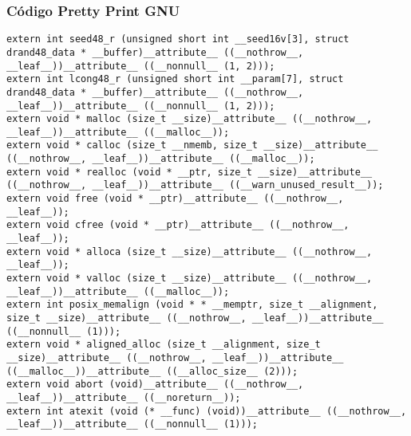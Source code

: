 \documentclass{beamer}
\begin{document}
\begin{frame}[fragile]
\frametitle{C\'odigo Pretty Print GNU}
\begin{verbatim}
extern int seed48_r (unsigned short int __seed16v[3], struct drand48_data * __buffer)__attribute__ ((__nothrow__, __leaf__))__attribute__ ((__nonnull__ (1, 2)));
extern int lcong48_r (unsigned short int __param[7], struct drand48_data * __buffer)__attribute__ ((__nothrow__, __leaf__))__attribute__ ((__nonnull__ (1, 2)));
extern void * malloc (size_t __size)__attribute__ ((__nothrow__, __leaf__))__attribute__ ((__malloc__));
extern void * calloc (size_t __nmemb, size_t __size)__attribute__ ((__nothrow__, __leaf__))__attribute__ ((__malloc__));
extern void * realloc (void * __ptr, size_t __size)__attribute__ ((__nothrow__, __leaf__))__attribute__ ((__warn_unused_result__));
extern void free (void * __ptr)__attribute__ ((__nothrow__, __leaf__));
extern void cfree (void * __ptr)__attribute__ ((__nothrow__, __leaf__));
extern void * alloca (size_t __size)__attribute__ ((__nothrow__, __leaf__));
extern void * valloc (size_t __size)__attribute__ ((__nothrow__, __leaf__))__attribute__ ((__malloc__));
extern int posix_memalign (void * * __memptr, size_t __alignment, size_t __size)__attribute__ ((__nothrow__, __leaf__))__attribute__ ((__nonnull__ (1)));
extern void * aligned_alloc (size_t __alignment, size_t __size)__attribute__ ((__nothrow__, __leaf__))__attribute__ ((__malloc__))__attribute__ ((__alloc_size__ (2)));
extern void abort (void)__attribute__ ((__nothrow__, __leaf__))__attribute__ ((__noreturn__));
extern int atexit (void (* __func) (void))__attribute__ ((__nothrow__, __leaf__))__attribute__ ((__nonnull__ (1)));
\end{verbatim}
\end{frame}
\end{document}
